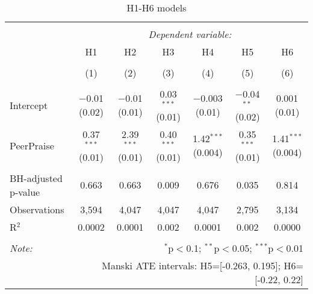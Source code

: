 
\begin{table}[!htbp] \centering 
  \caption{H1-H6 models} 
  \label{} 
\begin{tabular}{@{\extracolsep{5pt}}lcccccc} 
\\[-1.8ex]\hline 
\hline \\[-1.8ex] 
 & \multicolumn{6}{c}{\textit{Dependent variable:}} \\ 
\cline{2-7} 
 & H1 & H2 & H3 & H4 & H5 & H6 \\ 
\\[-1.8ex] & (1) & (2) & (3) & (4) & (5) & (6)\\ 
\hline \\[-1.8ex] 
 Intercept & $-$0.01 (0.02) & $-$0.01 (0.01) & 0.03$^{***}$ (0.01) & $-$0.003 (0.01) & $-$0.04$^{**}$ (0.02) & 0.001 (0.01) \\ 
  PeerPraise & 0.37$^{***}$ (0.01) & 2.39$^{***}$ (0.01) & 0.40$^{***}$ (0.01) & 1.42$^{***}$ (0.004) & 0.35$^{***}$ (0.01) & 1.41$^{***}$ (0.004) \\ 
 \hline \\[-1.8ex] 
BH-adjusted p-value & 0.663 & 0.663 & 0.009 & 0.676 & 0.035 & 0.814 \\ 
Observations & 3,594 & 4,047 & 4,047 & 4,047 & 2,795 & 3,134 \\ 
R$^{2}$ & 0.0002 & 0.0001 & 0.002 & 0.0001 & 0.002 & 0.0000 \\ 
\hline 
\hline \\[-1.8ex] 
\textit{Note:}  & \multicolumn{6}{r}{$^{*}$p$<$0.1; $^{**}$p$<$0.05; $^{***}$p$<$0.01} \\ 
 & \multicolumn{6}{r}{Manski ATE intervals: H5=[-0.263, 0.195]; H6=[-0.22, 0.22]} \\ 
\end{tabular} 
\end{table} 
